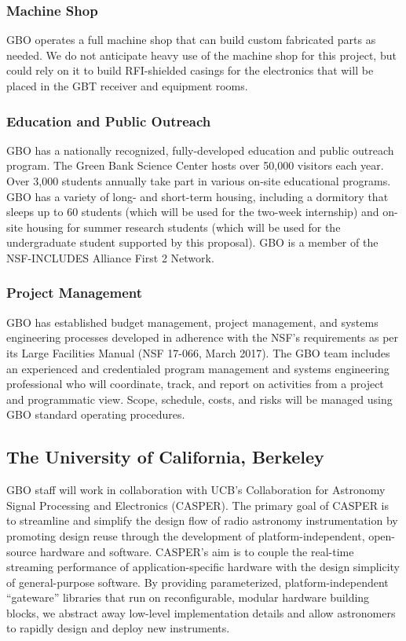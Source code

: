 \documentclass[10pt]{NSF}
\begin{document}
\subsubsection{Machine Shop}

GBO operates a full machine shop that can build custom fabricated
parts as needed.  We do not anticipate heavy use of the machine shop
for this project, but could rely on it to build RFI-shielded casings
for the electronics that will be placed in the GBT receiver and
equipment rooms.

\subsubsection{Education and Public Outreach}

GBO has a nationally recognized, fully-developed education and public
outreach program.  The Green Bank Science Center hosts over 50,000
visitors each year.  Over 3,000 students annually take part in various
on-site educational programs.  GBO has a variety of long- and
short-term housing, including a dormitory that sleeps up to 60
students (which will be used for the two-week internship) and on-site
housing for summer research students (which will be used for the
undergraduate student supported by this proposal).  GBO is a member of
the NSF-INCLUDES Alliance First 2 Network.

\subsubsection{Project Management}

GBO has established budget management, project management, and systems
engineering processes developed in adherence with the NSF's
requirements as per its Large Facilities Manual (NSF 17-066, March
2017). The GBO team includes an experienced and credentialed program
management and systems engineering professional who will coordinate,
track, and report on activities from a project and programmatic
view. Scope, schedule, costs, and risks will be managed using GBO
standard operating procedures.

\subsection{The University of California, Berkeley}

GBO staff will work in collaboration with UCB's Collaboration for
Astronomy Signal Processing and Electronics (CASPER). The primary goal
of CASPER is to streamline and simplify the design flow of radio
astronomy instrumentation by promoting design reuse through the
development of platform-independent, open-source hardware and
software.  CASPER's aim is to couple the real-time streaming
performance of application-specific hardware with the design
simplicity of general-purpose software. By providing parameterized,
platform-independent ``gateware'' libraries that run on
reconfigurable, modular hardware building blocks, we abstract away
low-level implementation details and allow astronomers to rapidly
design and deploy new instruments.
\end{document}
